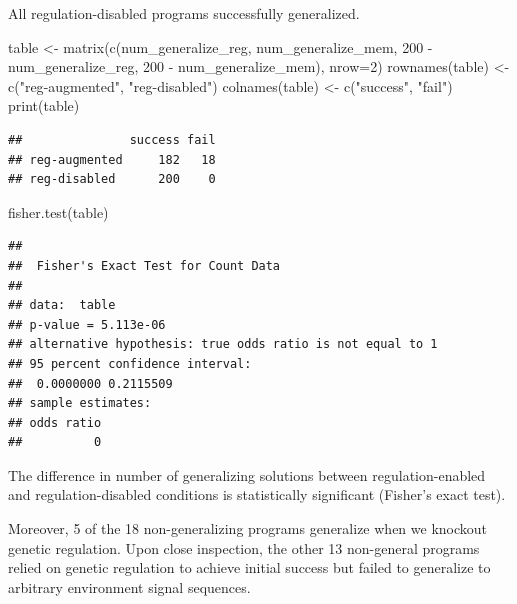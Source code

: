 \documentclass[
]{book}
\newenvironment{Shaded}{\begin{snugshade}}{\end{snugshade}}
\newcommand{\AttributeTok}[1]{\textcolor[rgb]{0.77,0.63,0.00}{#1}}
\newcommand{\DecValTok}[1]{\textcolor[rgb]{0.00,0.00,0.81}{#1}}
\newcommand{\FunctionTok}[1]{\textcolor[rgb]{0.00,0.00,0.00}{#1}}
\newcommand{\NormalTok}[1]{#1}
\newcommand{\OtherTok}[1]{\textcolor[rgb]{0.56,0.35,0.01}{#1}}
\newcommand{\SpecialCharTok}[1]{\textcolor[rgb]{0.00,0.00,0.00}{#1}}
\newcommand{\StringTok}[1]{\textcolor[rgb]{0.31,0.60,0.02}{#1}}
\begin{document}
All regulation-disabled programs successfully generalized.

\begin{Shaded}
\begin{Highlighting}[]
\NormalTok{table }\OtherTok{\textless{}{-}} \FunctionTok{matrix}\NormalTok{(}\FunctionTok{c}\NormalTok{(num\_generalize\_reg,}
\NormalTok{                  num\_generalize\_mem,}
                  \DecValTok{200} \SpecialCharTok{{-}}\NormalTok{ num\_generalize\_reg,}
                  \DecValTok{200} \SpecialCharTok{{-}}\NormalTok{ num\_generalize\_mem),}
                \AttributeTok{nrow=}\DecValTok{2}\NormalTok{)}
\FunctionTok{rownames}\NormalTok{(table) }\OtherTok{\textless{}{-}} \FunctionTok{c}\NormalTok{(}\StringTok{"reg{-}augmented"}\NormalTok{, }\StringTok{"reg{-}disabled"}\NormalTok{)}
\FunctionTok{colnames}\NormalTok{(table) }\OtherTok{\textless{}{-}} \FunctionTok{c}\NormalTok{(}\StringTok{"success"}\NormalTok{, }\StringTok{"fail"}\NormalTok{)}
\FunctionTok{print}\NormalTok{(table)}
\end{Highlighting}
\end{Shaded}

\begin{verbatim}
##               success fail
## reg-augmented     182   18
## reg-disabled      200    0
\end{verbatim}

\begin{Shaded}
\begin{Highlighting}[]
\FunctionTok{fisher.test}\NormalTok{(table)}
\end{Highlighting}
\end{Shaded}

\begin{verbatim}
## 
##  Fisher's Exact Test for Count Data
## 
## data:  table
## p-value = 5.113e-06
## alternative hypothesis: true odds ratio is not equal to 1
## 95 percent confidence interval:
##  0.0000000 0.2115509
## sample estimates:
## odds ratio 
##          0
\end{verbatim}

The difference in number of generalizing solutions between regulation-enabled and regulation-disabled conditions is statistically significant (Fisher's exact test).

Moreover, 5 of the 18 non-generalizing programs generalize when we knockout genetic regulation.
Upon close inspection, the other 13 non-general programs relied on genetic regulation to achieve initial success but failed to generalize to arbitrary environment signal sequences.
\end{document}
